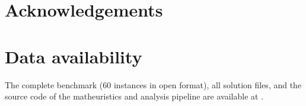 \documentclass[review,authoryear]{elsarticle}
\newcommand{\todo}[1]{}
\begin{document}








\section*{Acknowledgements}
\todo{Funding agencies (CNPq/FAPESP/CAPES?); company acknowledgement
(anonymized); thank GAMS academic license if applicable.}

\section*{Data availability}
The complete benchmark (60 instances in open format), all solution
files, and the source code of the matheuristics and analysis pipeline
are available at \todo{Zenodo DOI + GitHub URL after anonymization
decision}.



\end{document}

